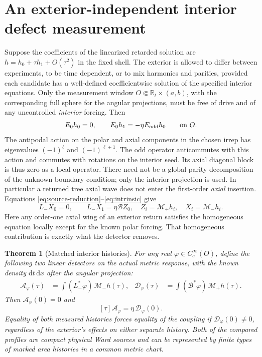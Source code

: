 \documentclass[11pt]{article}
\newtheorem{theorem}{Theorem}[section]
\newcommand{\dd}{\mathrm d}
\begin{document}
\section{An exterior-independent interior defect measurement}\label{sec:filter}

Suppose the coefficients of the linearized retarded solution are $h=h_0+\tau h_1+O(\tau^2)$ in the fixed shell. The exterior is allowed to differ between experiments, to be time dependent, or to mix harmonics and parities, provided each candidate has a well-defined coefficientwise solution of the specified interior equations. Only the measurement window $O\Subset\mathbb R_t\times(a,b)$, with the corresponding full sphere for the angular projections, must be free of drive and of any uncontrolled \emph{interior} forcing. Then
\[
 E_0h_0=0,\qquad E_0h_1=-\eta E_{\rm odd}h_0\qquad\text{on }O.
\]
The antipodal action on the polar and axial components in the chosen irrep has eigenvalues $(-1)^\ell$ and $(-1)^{\ell+1}$. The odd operator anticommutes with this action and commutes with rotations on the interior seed. Its axial diagonal block is thus zero as a local operator. There need not be a global parity decomposition of the unknown boundary condition; only the interior projection is used. In particular a returned tree axial wave does not enter the first-order \emph{axial} insertion. Equations \eqref{eq:source-reduction}--\eqref{eq:intrinsic} give
\begin{equation}\label{eq:master-orders}
 L_-X_0=0,\qquad L_-X_1=\eta\mathcal B Z_0,
 \quad Z_i=\mathcal M_+h_i,\quad X_i=\mathcal M_-h_i.
\end{equation}
Here any order-one axial wing of an exterior return satisfies the homogeneous equation locally except for the known polar forcing. That homogeneous contribution is exactly what the detector removes.

\begin{samepage}
\begin{theorem}[Matched interior histories]\label{thm:filter}
For any real $\varphi\in C_c^\infty(O)$, define the following two linear detectors on the actual metric response, with the known density $\dd t\,\dd x$ after the angular projection:
\begin{align}
 \mathcal A_\varphi(\tau)&=\int (L_-^*\varphi)\,\mathcal M_- h(\tau),&
 \mathcal D_\varphi(\tau)&=\int (\mathcal B^*\varphi)\,\mathcal M_+ h(\tau).
 \label{eq:detectors}
\end{align}
Then $\mathcal A_\varphi(0)=0$ and
\begin{equation}\label{eq:readout}
 [\tau]\mathcal A_\varphi=\eta\,\mathcal D_\varphi(0).
\end{equation}
Equality of both measured histories forces equality of the coupling if $\mathcal D_\varphi(0)\ne0$, regardless of the exterior's effects on either separate history. Both of the compared profiles are compact physical Ward sources and can be represented by finite types of marked area histories in a common metric chart.
\end{theorem}
\end{samepage}
\end{document}
